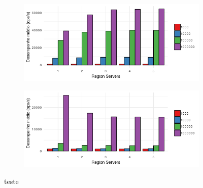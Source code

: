 \documentclass[12pt]{article}
\begin{document}
\begin{figure}
    \centering
    \begin{subfigure}[b]{0.49\textwidth}
        \centering
        \includegraphics[width=\textwidth]{images/figura17}
        \caption{}
        \label{fig:mean and std of net14}
    \end{subfigure}
        \hfill
    \begin{subfigure}[b]{0.49\textwidth}  
        \centering 
        \includegraphics[width=\textwidth]{images/figura18}
        \caption{}%
    \end{subfigure}
    \caption{teste}
\end{figure}
\end{document}
